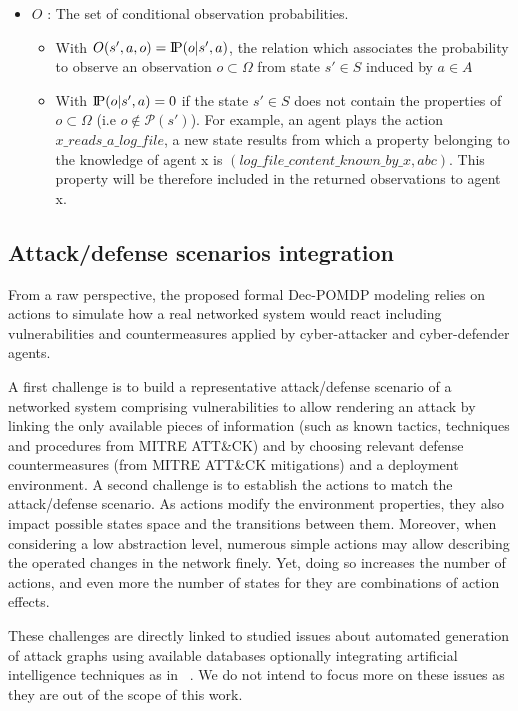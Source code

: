 \documentclass[conference]{IEEEtran}
\newcommand{\probP}{\text{I\kern-0.15em P}}
\begin{document}
\begin{itemize}
    \item $O$ : The set of conditional observation probabilities.
          \begin{itemize}
              \item With $O(s',a,o) = \probP(o|s',a)$, the relation which associates the probability to observe an observation $o \subset \Omega$ from state $s' \in S$ induced by $a \in A$
              \item With $\probP(o|s',a) = 0$ if the state $s' \in S$ does not contain the properties of $o \subset \Omega$ (i.e $o \not\in \mathcal{P}(s')$). For example, an agent plays the action $x\_reads\_a\_log\_file$, a new state results from which a property belonging to the knowledge of agent x is $(log\_file\_content\_known\_by\_x, \allowbreak abc)$. This property will be therefore included in the returned observations to agent x.
          \end{itemize}

\end{itemize}


\subsection{Attack/defense scenarios integration\label{sec:ad_integration}}

\noindent
From a raw perspective, the proposed formal Dec-POMDP modeling relies on actions to simulate how a real networked system would react including vulnerabilities and countermeasures applied by cyber-attacker and cyber-defender agents.

A first challenge is to build a representative attack/defense scenario of a networked system comprising vulnerabilities to allow rendering an attack by linking the only available pieces of information (such as known tactics, techniques and procedures from MITRE ATT\&CK) and by choosing relevant defense countermeasures (from MITRE ATT\&CK mitigations) and a deployment environment. A second challenge is to establish the actions to match the attack/defense scenario. As actions modify the environment properties, they also impact possible states space and the transitions between them.
Moreover, when considering a low abstraction level, numerous simple actions may allow describing the operated changes in the network finely. Yet, doing so increases the number of actions, and even more the number of states for they are combinations of action effects.

These challenges are directly linked to studied issues about automated generation of attack graphs using available databases optionally integrating artificial intelligence techniques as in ~\cite{GFalco2018}. We do not intend to focus more on these issues as they are out of the scope of this work.
\end{document}

